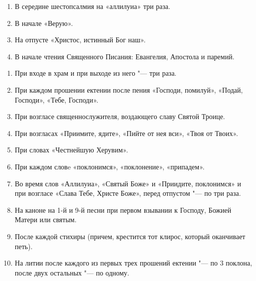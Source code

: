 \begin{mymulticols}


\begin{enumerate}

\item В середине шестопсалмия на «аллилуиа» три раза. 

\item В начале «Верую». 

\item На отпусте «Христос, истинный Бог наш». 

\item В начале чтения Священного Писания: Евангелия, Апостола и паремий. 

\end{enumerate}


\begin{enumerate}

\item При входе в храм и при выходе из него "--- три раза. 

\item При каждом прошении ектении после пения «Господи, помилуй», «Подай, Господи», «Тебе, Господи». 

\item При возгласе священнослужителя, воздающего славу Святой Троице. 

\item При возгласах «Приимите, ядите», «Пийте от нея вси», «Твоя от Твоих». 

\item При словах «Честнейшую Херувим». 

\item При каждом словe «поклонимся», «поклонение», «припадем». 

\item Во время слов «Аллилуиа», «Святый Боже» и «Приидите, поклонимся» и при возгласе «Слава Тебе, Христе Боже», перед отпустом "--- по три раза. 

\item На каноне на 1-й и 9-й песни при первом взывании к Господу, Божией Матери или святым.

\item После каждой стихиры (причем, крестится тот клирос, который оканчивает петь).

\item На литии после каждого из первых трех прошений ектении "--- по 3 поклона, после двух остальных "--- по одному.


\end{enumerate}
\end{mymulticols}
